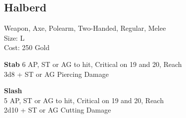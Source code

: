 \subsection{Halberd}\label{weapon:halberd}
Weapon, Axe, Polearm, Two-Handed, Regular, Melee\\
Size: L\\
Cost: 250 Gold

\textbf{Stab}
6 AP, ST or AG to hit, Critical on 19 and 20,  Reach\\
3d8 + \texttimes ST or AG Piercing Damage

\textbf{Slash}\\
5 AP, ST or AG to hit, Critical on 19 and 20,  Reach\\
2d10 + \texttimes ST or AG Cutting Damage

